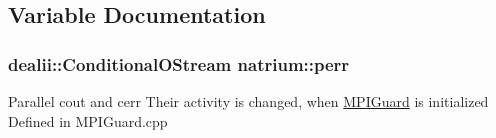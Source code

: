 \subsection{Variable Documentation}
\hypertarget{namespacenatrium_a3cedd4d2c74ed3a6e0f61166ddff40d1}{
\subsubsection[{perr}]{\setlength{\rightskip}{0pt plus 5cm}dealii::ConditionalOStream {\bf natrium::perr}}}
\label{namespacenatrium_a3cedd4d2c74ed3a6e0f61166ddff40d1}
Parallel cout and cerr Their activity is changed, when \hyperlink{classnatrium_1_1MPIGuard}{MPIGuard} is initialized Defined in MPIGuard.cpp 
